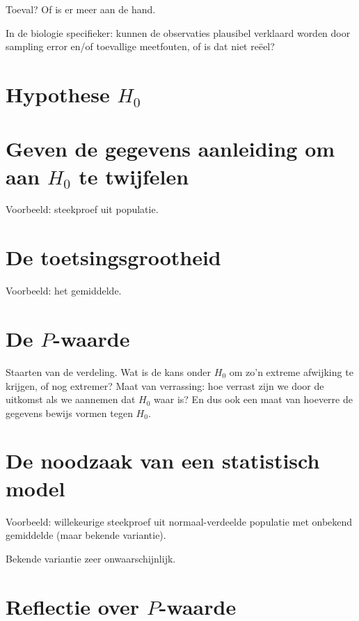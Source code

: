 \documentclass[
  a4paper,
]{scrbook}
\theoremstyle{definition}
\theoremstyle{definition}
\theoremstyle{remark}
\begin{document}
Toeval? Of is er meer aan de hand.

In de biologie specifieker: kunnen de observaties plausibel verklaard
worden door sampling error en/of toevallige meetfouten, of is dat niet
reëel?

\section{\texorpdfstring{Hypothese
\(H_\textrm{0}\)}{Hypothese H\_\textbackslash textrm\{0\}}}\label{hypothese-h_textrm0}

\section{\texorpdfstring{Geven de gegevens aanleiding om aan
\(H_\textrm{0}\) te
twijfelen}{Geven de gegevens aanleiding om aan H\_\textbackslash textrm\{0\} te twijfelen}}\label{geven-de-gegevens-aanleiding-om-aan-h_textrm0-te-twijfelen}

Voorbeeld: steekproef uit populatie.

\section{De toetsingsgrootheid}\label{de-toetsingsgrootheid}

Voorbeeld: het gemiddelde.

\section{\texorpdfstring{De
\(P\)-waarde}{De P-waarde}}\label{de-p-waarde}

Staarten van de verdeling. Wat is de kans onder \(H_\textrm{0}\) om zo'n
extreme afwijking te krijgen, of nog extremer? Maat van verrassing: hoe
verrast zijn we door de uitkomst als we aannemen dat \(H_\textrm{0}\)
waar is? En dus ook een maat van hoeverre de gegevens bewijs vormen
tegen \(H_\textrm{0}\).

\section{De noodzaak van een statistisch
model}\label{de-noodzaak-van-een-statistisch-model}

Voorbeeld: willekeurige steekproef uit normaal-verdeelde populatie met
onbekend gemiddelde (maar bekende variantie).

Bekende variantie zeer onwaarschijnlijk.

\section{\texorpdfstring{Reflectie over
\(P\)-waarde}{Reflectie over P-waarde}}\label{reflectie-over-p-waarde}
\end{document}

